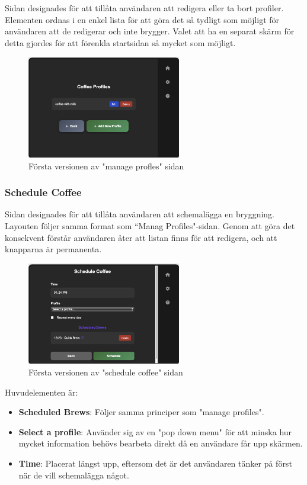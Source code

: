 Sidan designades för att tillåta användaren att redigera eller ta bort profiler. Elementen ordnas i en enkel lista för att göra det så tydligt som möjligt för användaren att de redigerar och inte brygger. Valet att ha en separat skärm för detta gjordes för att förenkla startsidan så mycket som möjligt.
\begin{figure}[H]
    \centering
    \includegraphics[width=0.6\textwidth]{bilder/manage.png}
    \caption{Första versionen av "manage profles" sidan}
    \label{fig:manage_v1}
\end{figure}

\subsubsection{Schedule Coffee}

Sidan designades för att tillåta användaren att schemalägga en bryggning. Layouten följer samma format som “Manag Profiles"-sidan. Genom att göra det konsekvent förstår användaren åter att listan finns för att redigera, och att knapparna är permanenta. 
\begin{figure}[H]
    \centering
    \includegraphics[width=0.6\textwidth]{bilder/schedule.png}
    \caption{Första versionen av "schedule coffee" sidan}
    \label{fig:schedule_v1}
\end{figure}

Huvudelementen är:
\begin{itemize}
    \item \textbf{Scheduled Brews}: Följer samma principer som "manage profiles".
    \item \textbf{Select a profile}: Använder sig av en "pop down menu" för att minska hur mycket information behövs bearbeta direkt då en användare får upp skärmen. 
    \item \textbf{Time}: Placerat längst upp, eftersom det är det användaren tänker på först när de vill schemalägga något. 
\end{itemize}


